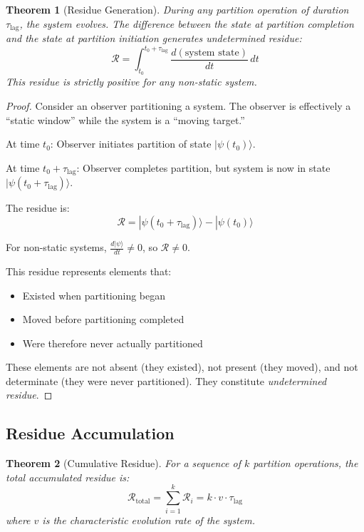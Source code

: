\documentclass[twocolumn,10pt,a4paper]{article}
\newtheorem{theorem}{Theorem}[section]
\theoremstyle{definition}
\theoremstyle{remark}
\newcommand{\Residue}{\mathcal{R}}
\newcommand{\Lag}{\tau_{\mathrm{lag}}}
\begin{document}
\begin{theorem}[Residue Generation]
\label{thm:residue}
During any partition operation of duration $\Lag$, the system evolves. The difference between the state at partition completion and the state at partition initiation generates \emph{undetermined residue}:
\begin{equation}
    \Residue = \int_{t_0}^{t_0 + \Lag} \frac{d(\text{system state})}{dt} \, dt
\end{equation}
This residue is strictly positive for any non-static system.
\end{theorem}

\begin{proof}
Consider an observer partitioning a system. The observer is effectively a ``static window'' while the system is a ``moving target.''

At time $t_0$: Observer initiates partition of state $|\psi(t_0)\rangle$.

At time $t_0 + \Lag$: Observer completes partition, but system is now in state $|\psi(t_0 + \Lag)\rangle$.

The residue is:
\begin{equation}
    \Residue = |\psi(t_0 + \Lag)\rangle - |\psi(t_0)\rangle
\end{equation}

For non-static systems, $\frac{d|\psi\rangle}{dt} \neq 0$, so $\Residue \neq 0$.

This residue represents elements that:
\begin{itemize}
    \item Existed when partitioning began
    \item Moved before partitioning completed
    \item Were therefore never actually partitioned
\end{itemize}

These elements are not absent (they existed), not present (they moved), and not determinate (they were never partitioned). They constitute \emph{undetermined residue}.
\end{proof}

\subsection{Residue Accumulation}

\begin{theorem}[Cumulative Residue]
\label{thm:cumulative}
For a sequence of $k$ partition operations, the total accumulated residue is:
\begin{equation}
    \Residue_{\text{total}} = \sum_{i=1}^{k} \Residue_i = k \cdot v \cdot \Lag
\end{equation}
where $v$ is the characteristic evolution rate of the system.
\end{theorem}
\end{document}
